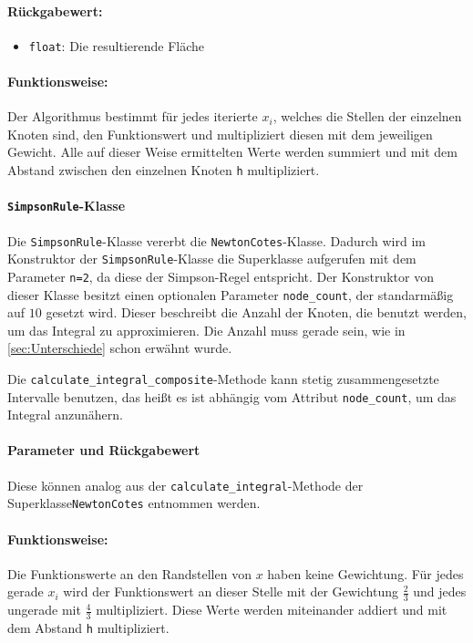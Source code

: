 \paragraph{Rückgabewert:}
\begin{itemize}
    \item \texttt{float}: Die resultierende Fläche
\end{itemize}

\paragraph{Funktionsweise:}
Der Algorithmus bestimmt für jedes iterierte $x_i$, welches die Stellen der einzelnen Knoten sind, den Funktionswert und multipliziert diesen mit dem jeweiligen Gewicht. Alle auf dieser Weise ermittelten Werte werden summiert und mit dem Abstand zwischen den einzelnen Knoten \texttt{h} multipliziert.

\paragraph{\texttt{SimpsonRule}-Klasse}
Die \texttt{SimpsonRule}-Klasse vererbt die \texttt{NewtonCotes}-Klasse. Dadurch wird im Konstruktor der \texttt{SimpsonRule}-Klasse die Superklasse aufgerufen mit dem Parameter \texttt{n=2}, da diese der Simpson-Regel entspricht. Der Konstruktor von dieser Klasse besitzt einen optionalen Parameter \texttt{node\_count}, der standarmäßig auf $10$ gesetzt wird. Dieser beschreibt die Anzahl der Knoten, die benutzt werden, um das Integral zu approximieren. Die Anzahl muss gerade sein, wie in \ref{sec:Unterschiede} schon erwähnt wurde.

Die \texttt{calculate\_integral\_composite}-Methode kann stetig zusammengesetzte Intervalle benutzen, das heißt es ist abhängig vom Attribut \texttt{node\_count}, um das Integral anzunähern.

\paragraph{Parameter und Rückgabewert}
Diese können analog aus der \texttt{calculate\_integral}-Methode der Superklasse\texttt{NewtonCotes} entnommen werden.

\paragraph{Funktionsweise:}
Die Funktionswerte an den Randstellen von $x$ haben keine Gewichtung. Für jedes gerade $x_i$ wird der Funktionswert an dieser Stelle mit der Gewichtung $\frac{2}{3}$ und jedes ungerade mit $\frac{4}{3}$ multipliziert. Diese Werte werden miteinander addiert und mit dem Abstand \texttt{h} multipliziert.

